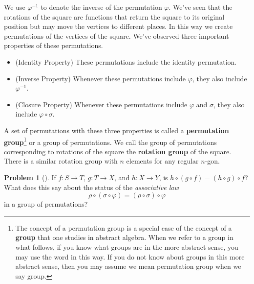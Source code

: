 \documentclass[10pt,]{book}
\newcommand{\terminology}[1]{\textbf{#1}}
\theoremstyle{plain}
\theoremstyle{definition}
\newtheorem{activity}[project]{Problem}
\theoremstyle{definition}
\numberwithin{equation}{chapter}
\begin{document}
\par
We use \(\varphi^{-1}\) to denote the inverse of the permutation \(\varphi\). We've seen that the rotations of the square are functions that return the square to its original position but may move the vertices to different places. In this way we create permutations of the vertices of the square. We've observed three important properties of these permutations. \leavevmode%
\begin{itemize}[label=\textbullet]
\item{}(Identity Property) These permutations include the identity permutation.%
\item{}(Inverse Property) Whenever these permutations include \(\varphi\), they also include \(\varphi^{-1}\).%
\item{}(Closure Property)  Whenever these permutations include \(\varphi\) and \(\sigma\), they also include \(\varphi\circ\sigma\).%
\end{itemize}
%
\par
A set of permutations with these three properties is called a \terminology{permutation group}\footnote{The concept of a permutation group is a special case of the concept of a \terminology{group} that one studies in abstract algebra.  When we refer to a group in what follows, if you  know what groups are in the more abstract sense, you may use the word in this way. If you do not know about groups in this more abstract sense, then you may assume we mean permutation group when we say group.\label{fn-20}} or a group of permutations. We call the group of permutations corresponding to rotations of the square the \terminology{rotation group} of the square. There is a similar rotation group with \(n\) elements for any regular \(n\)-gon.%
\begin{activity}[] \label{activity-252}
If \(f:S\rightarrow T\), \(g:T\rightarrow X\), and \(h:X \rightarrow Y\), is \(h\circ(g\circ f) = (h\circ g)\circ f\)? What does this say about the status of the \emph{associative law}%
\begin{equation*}
\rho\circ(\sigma\circ \varphi) = (\rho\circ \sigma)\circ\varphi
\end{equation*}
in a group of permutations?%
\end{activity}
\end{document}
